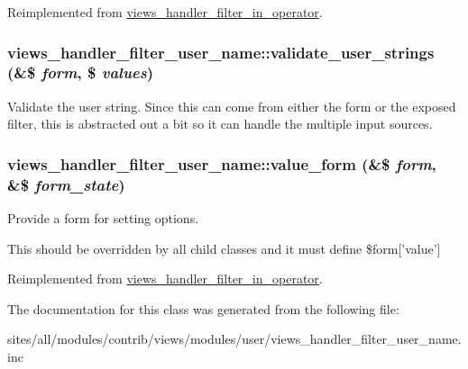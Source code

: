 Reimplemented from \hyperlink{classviews__handler__filter__in__operator_a5b5df6d90f4359ed28c0c446bdc81a6}{views\_\-handler\_\-filter\_\-in\_\-operator}.\hypertarget{classviews__handler__filter__user__name_8c3d5b4e3a63b0e39fcf36a2ab5ef43d}{
\subsubsection[{validate\_\-user\_\-strings}]{\setlength{\rightskip}{0pt plus 5cm}views\_\-handler\_\-filter\_\-user\_\-name::validate\_\-user\_\-strings (\&\$ {\em form}, \/  \$ {\em values})}}
\label{classviews__handler__filter__user__name_8c3d5b4e3a63b0e39fcf36a2ab5ef43d}


Validate the user string. Since this can come from either the form or the exposed filter, this is abstracted out a bit so it can handle the multiple input sources. \hypertarget{classviews__handler__filter__user__name_08bc953c1682728eb0d38e5592a3286e}{
\subsubsection[{value\_\-form}]{\setlength{\rightskip}{0pt plus 5cm}views\_\-handler\_\-filter\_\-user\_\-name::value\_\-form (\&\$ {\em form}, \/  \&\$ {\em form\_\-state})}}
\label{classviews__handler__filter__user__name_08bc953c1682728eb0d38e5592a3286e}


Provide a form for setting options.

This should be overridden by all child classes and it must define \$form\mbox{[}'value'\mbox{]} 

Reimplemented from \hyperlink{classviews__handler__filter__in__operator_6736083657cad0f8c7299b000f2b8e60}{views\_\-handler\_\-filter\_\-in\_\-operator}.

The documentation for this class was generated from the following file:\begin{CompactItemize}
\item 
sites/all/modules/contrib/views/modules/user/views\_\-handler\_\-filter\_\-user\_\-name.inc\end{CompactItemize}
